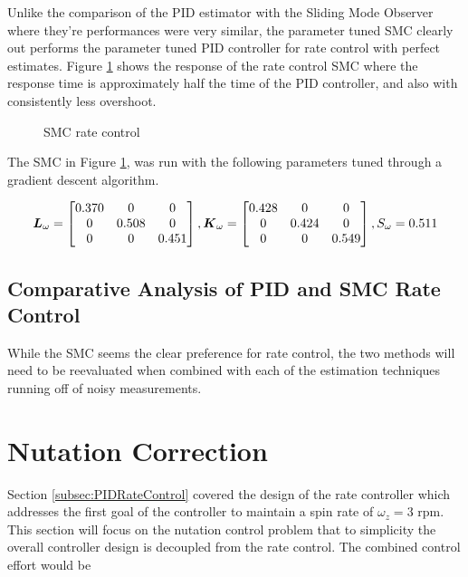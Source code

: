 Unlike the comparison of the PID estimator with the Sliding Mode Observer where they're performances were very similar, the parameter tuned SMC clearly out performs the parameter tuned PID controller for rate control with perfect estimates.  Figure \ref{fig:SMCRateControl} shows the response of the rate control SMC where the response time is approximately half the time of the PID controller, and also with consistently less overshoot.

\begin{figure}[H]
  \centerline{}
  \caption{SMC rate control}
  \label{fig:SMCRateControl}
\end{figure}

The SMC in Figure \ref{fig:SMCRateControl}, was run with the following parameters tuned through a gradient descent algorithm.

\begin{equation}
    \boldsymbol{L}_{\omega} = \begin{bmatrix} 0.370 & 0 & 0 \\ 0 & 0.508 & 0 \\ 0 & 0 & 0.451 \end{bmatrix},
    \boldsymbol{K}_{\omega} = \begin{bmatrix} 0.428 & 0 & 0 \\ 0 & 0.424 & 0 \\ 0 & 0 & 0.549 \end{bmatrix},
    S_{\omega} = 0.511
  \label{SMCRateControlGains}
\end{equation}

\subsection{Comparative Analysis of PID and SMC Rate Control}
\label{subsec:ComparativeAnalysisofPIDandSMCRateControl}


While the SMC seems the clear preference for rate control, the two methods will need to be reevaluated when combined with each of the estimation techniques running off of noisy measurements.

\section{Nutation Correction}
\label{sec:NutationCorrection}

Section \ref{subsec:PIDRateControl} covered the design of the rate controller which addresses the first goal of the controller to maintain a spin rate of $\omega_z = 3$ rpm.  This section will focus on the nutation control problem that to simplicity the overall controller design is decoupled from the rate control.  The combined control effort would be

